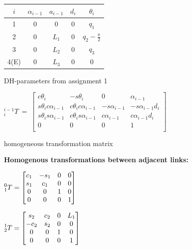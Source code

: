 \documentclass[a4paper,10pt]{article}
\begin{document}
\begin{minipage}[b]{0.49\textwidth}
\centering
\begin{tabular}{c|c|c|c|c}
  $i$ & $\alpha_{i-1}$ & $a_{i-1}$ & $d_i$ &      $\theta_i$        \\\hline\hline
  1  &        0       &     0     &   0   &          $q_1$         \\
  2  &        0       &   $L_1$   &   0   & $q_2 - \frac{\pi}{2}$  \\
  3  &        0       &   $L_2$   &   0   &          $q_3$         \\
4(E) &        0       &   $L_3$   &   0   &           0
\end{tabular}
  
\vspace{1em}DH-parameters from assignment 1
\end{minipage}
\begin{minipage}[b]{0.49\textwidth}
\centering
${}^{i-1}_{i}T~=~\begin{bmatrix}
c\theta_i & -s\theta_i & 0 & \alpha_{i-1} \\
s\theta_ic\alpha_{i-1} & c\theta_ic\alpha_{i-1} & -s\alpha_{i-1} & -s\alpha_{i-1}d_i \\
s\theta_is\alpha_{i-1} & c\theta_is\alpha_{i-1} & c\alpha_{i-1} & c\alpha_{i-1}d_i \\
0 & 0 & 0 & 1 \\
\end{bmatrix}$

\vspace{1em}\hspace{1.8 cm}homogeneous transformation matrix
\end{minipage}

\textbf{Homogenous transformations between adjacent links:}

$\prescript{0}{1}{T}=
\begin{bmatrix} 
c_1 & -s_1  & 0 & 0\\
s_1 & c_1 & 0 & 0 \\
0 & 0 & 1 & 0 \\
0 & 0 & 0 & 1 
\end{bmatrix}
$

$
\prescript{1}{2}{T}=
\begin{bmatrix} 
s_2 & c_2 & 0 & L_1 \\
-c_2 & s_2 & 0 & 0 \\
0 & 0 & 1 & 0 \\
0 & 0 & 0 & 1
\end{bmatrix}
$
\end{document}
